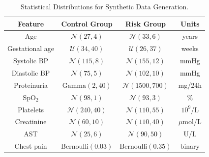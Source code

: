 \documentclass[diagnostics,article,submit,pdftex,moreauthors]{Definitions/mdpi}
\begin{document}


\begin{table}[H]
  \small
  \centering
  \caption{Statistical Distributions for Synthetic Data Generation.\label{tab:distributions}}
\begin{tabularx}{\textwidth}{CCCC}%
\toprule
\textbf{Feature} & \textbf{Control Group} & \textbf{Risk Group} & \textbf{Units} \\
\midrule
Age & $\mathcal{N}(27, 4)$ & $\mathcal{N}(33, 6)$ & years \\
Gestational age & $\mathcal{U}(34, 40)$ & $\mathcal{U}(26, 37)$ & weeks \\
Systolic BP & $\mathcal{N}(115, 8)$ & $\mathcal{N}(155, 12)$ & mmHg \\
Diastolic BP & $\mathcal{N}(75, 5)$ & $\mathcal{N}(102, 10)$ & mmHg \\
Proteinuria & $\text{Gamma}(2, 40)$ & $\mathcal{N}(1500, 700)$ & mg/24h \\
SpO$_2$ & $\mathcal{N}(98, 1)$ & $\mathcal{N}(93, 3)$ & \% \\
Platelets & $\mathcal{N}(240, 40)$ & $\mathcal{N}(110, 55)$ & $10^9$/L \\
Creatinine & $\mathcal{N}(60, 10)$ & $\mathcal{N}(110, 40)$ & $\mu$mol/L \\
AST & $\mathcal{N}(25, 6)$ & $\mathcal{N}(90, 50)$ & U/L \\
Chest pain & $\text{Bernoulli}(0.03)$ & $\text{Bernoulli}(0.35)$ & binary \\
\bottomrule
\end{tabularx}
\end{table}
\end{document}
